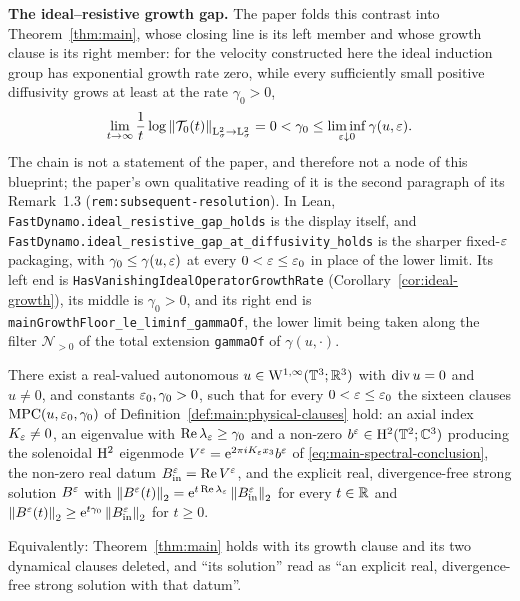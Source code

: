 \textbf{The ideal--resistive growth gap.}  The paper folds this contrast into
Theorem~\ref{thm:main}, whose closing line is its left member and
whose growth clause is its right member: for the velocity constructed here the ideal
induction group has exponential growth rate zero, while every sufficiently small positive
diffusivity grows at least at the rate $\gamma_0>0$,
\[
  \lim_{t\to\infty}\frac1t
  \log\left\|\mathcal T_0(t)\right\|_{\mathrm{L}^2_\sigma\to\mathrm{L}^2_\sigma}
  =0<\gamma_0\leq\liminf_{\varepsilon\downarrow0}\gamma(u,\varepsilon).
\]
The chain is not a statement of the paper, and therefore not a node of this
blueprint; the paper's own qualitative reading of it is the second paragraph of its
Remark~1.3 (\texttt{rem:subsequent-resolution}).  In Lean,
\texttt{FastDynamo.ideal\_resistive\_gap\_holds} is the display itself, and
\texttt{FastDynamo.ideal\_resistive\_gap\_at\_diffusivity\_holds} is the sharper fixed-$\varepsilon$
packaging, with $\gamma_0\leq\gamma(u,\varepsilon)$ at every $0<\varepsilon\leq\varepsilon_0$ in place of the lower
limit.  Its left end is \texttt{HasVanishingIdealOperatorGrowthRate}
(Corollary~\ref{cor:ideal-growth}), its middle is $\gamma_0>0$, and its right end is
\texttt{mainGrowthFloor\_le\_liminf\_gammaOf}, the lower limit being taken along the filter
$\mathcal N_{>0}$ of the total extension \texttt{gammaOf} of $\gamma(u,\cdot)$.

\begin{theorem}
  \label{thm:main-spectral}
  \leanok
  There exist a real-valued autonomous $u\in\mathrm{W}^{1,\infty}(\mathbb{T}^3;\mathbb{R}^3)$ with
  $\operatorname{div} u=0$ and $u\neq0$, and constants $\varepsilon_0,\gamma_0>0$, such that for
  every $0<\varepsilon\leq\varepsilon_0$ the sixteen clauses
  $\mathrm{MPC}(u,\varepsilon_0,\gamma_0)$ of
  Definition~\ref{def:main:physical-clauses} hold: an axial index
  $K_\varepsilon\neq0$, an eigenvalue with $\operatorname{Re}\lambda_\varepsilon\geq\gamma_0$ and a
  non-zero $b^\varepsilon\in\mathrm{H}^2(\mathbb{T}^2;\mathbb{C}^3)$ producing the solenoidal $\mathrm{H}^2$
  eigenmode $V^\varepsilon=\mathrm{e}^{2\pi iK_\varepsilon x_3}b^\varepsilon$ of
  \eqref{eq:main-spectral-conclusion}, the non-zero real datum
  $B_{\rm in}^\varepsilon=\operatorname{Re} V^\varepsilon$, and the explicit real, divergence-free strong
  solution $B^\varepsilon$ with
  $\left\|B^\varepsilon(t)\right\|_2=\mathrm{e}^{t\operatorname{Re}\lambda_\varepsilon}\left\|B_{\rm in}^\varepsilon\right\|_2$ for every
  $t\in\mathbb{R}$ and $\left\|B^\varepsilon(t)\right\|_2\geq\mathrm{e}^{t\gamma_0}\left\|B_{\rm in}^\varepsilon\right\|_2$
  for $t\geq0$.

  Equivalently: Theorem~\ref{thm:main} holds with its growth clause and its two dynamical
  clauses deleted, and ``its solution'' read as ``an explicit real, divergence-free strong
  solution with that datum''.
\end{theorem}

